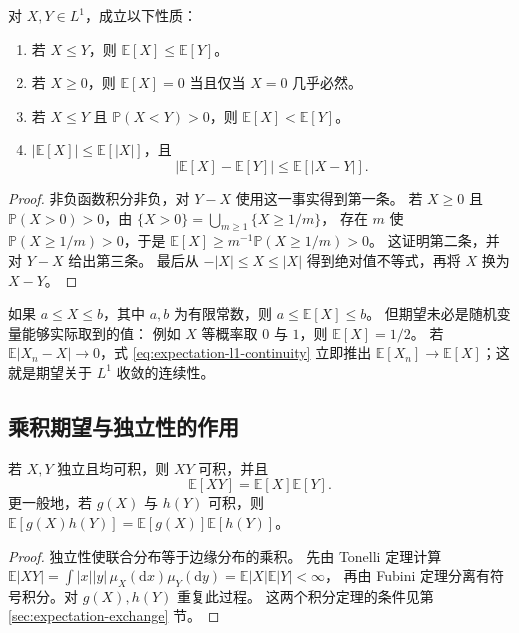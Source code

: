 \documentclass[UTF8,12pt,a4paper,fontset=fandol]{ctexart}
\begin{document}
\begin{proposition}[保序与绝对值控制]
\label{prop:expectation-order}
对 $X,Y\in L^1$，成立以下性质：
\begin{enumerate}
  \item 若 $X\leq Y$，则 $\mathbb E[X]\leq\mathbb E[Y]$。
  \item 若 $X\geq0$，则 $\mathbb E[X]=0$ 当且仅当 $X=0$ 几乎必然。
  \item 若 $X\leq Y$ 且 $\mathbb P(X<Y)>0$，则 $\mathbb E[X]<\mathbb E[Y]$。
  \item $|\mathbb E[X]|\leq\mathbb E[|X|]$，且
  \begin{equation}
    |\mathbb E[X]-\mathbb E[Y]|\leq\mathbb E[|X-Y|].
    \label{eq:expectation-l1-continuity}
  \end{equation}
\end{enumerate}
\end{proposition}

\begin{proof}
非负函数积分非负，对 $Y-X$ 使用这一事实得到第一条。
若 $X\geq0$ 且 $\mathbb P(X>0)>0$，由
$\{X>0\}=\bigcup_{m\geq1}\{X\geq1/m\}$，
存在 $m$ 使 $\mathbb P(X\geq1/m)>0$，于是
$\mathbb E[X]\geq m^{-1}\mathbb P(X\geq1/m)>0$。
这证明第二条，并对 $Y-X$ 给出第三条。
最后从 $-|X|\leq X\leq|X|$ 得到绝对值不等式，再将 $X$ 换为 $X-Y$。
\end{proof}

如果 $a\leq X\leq b$，其中 $a,b$ 为有限常数，则 $a\leq\mathbb E[X]\leq b$。
但期望未必是随机变量能够实际取到的值：
例如 $X$ 等概率取 $0$ 与 $1$，则 $\mathbb E[X]=1/2$。
若 $\mathbb E|X_n-X|\to0$，式 \eqref{eq:expectation-l1-continuity} 立即推出
$\mathbb E[X_n]\to\mathbb E[X]$；这就是期望关于 $L^1$ 收敛的连续性。

\subsection{乘积期望与独立性的作用}

\begin{proposition}[独立变量的乘积]
\label{prop:expectation-independent-product}
若 $X,Y$ 独立且均可积，则 $XY$ 可积，并且
\begin{equation}
  \mathbb E[XY]=\mathbb E[X]\mathbb E[Y].
  \label{eq:expectation-product}
\end{equation}
更一般地，若 $g(X)$ 与 $h(Y)$ 可积，则
$\mathbb E[g(X)h(Y)]=\mathbb E[g(X)]\mathbb E[h(Y)]$。
\end{proposition}

\begin{proof}
独立性使联合分布等于边缘分布的乘积。
先由 Tonelli 定理计算
$\mathbb E|XY|=\int|x||y|\,\mu_X(\mathrm dx)\mu_Y(\mathrm dy)
=\mathbb E|X|\mathbb E|Y|<\infty$，
再由 Fubini 定理分离有符号积分。对 $g(X),h(Y)$ 重复此过程。
这两个积分定理的条件见第 \ref{sec:expectation-exchange} 节。
\end{proof}
\end{document}

